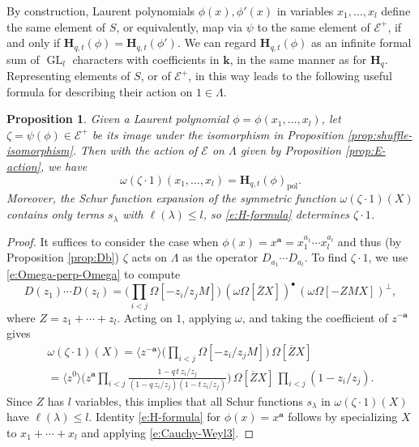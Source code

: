 \documentclass[12pt]{amsart}
\newtheorem{prop}[thm]{Proposition}
\theoremstyle{definition}
\theoremstyle{remark}
\newcommand{\kk}{{\mathbf k}}
\newcommand{\aA}{{\mathbf a}}
\newcommand{\Hbold}{{\mathbf H}}
\newcommand{\Ecal}{{\mathcal E}}
\DeclareMathOperator{\pol}{pol}
\DeclareMathOperator{\GL}{GL}
\begin{document}
By construction, Laurent polynomials $\phi(x), \phi '(x)$ in variables
$x_{1},\ldots,x_{l}$ define the same element of $S$, or equivalently,
map via $\psi $ to the same element of $\Ecal ^{+}$, if and only if
$\Hbold _{q,t}(\phi ) = \Hbold _{q,t}(\phi ')$.  We can regard $\Hbold
_{q,t}(\phi )$ as an infinite formal sum of $\GL _{l}$ characters with
coefficients in $\kk $, in the same manner as for $\Hbold _{q}$.
Representing elements of $S$, or of $\Ecal ^{+}$, in this way leads to
the following useful formula for describing their action on $1\in
\Lambda $.

\begin{prop}\label{prop:H-formula}
Given a Laurent polynomial $\phi=\phi (x_{1},\ldots,x_{l})$, let $\zeta =
\psi (\phi ) \in \Ecal ^{+}$ be its image under the isomorphism in
Proposition \ref{prop:shuffle-isomorphism}.  Then with the action of
$\Ecal $ on $\Lambda $ given by Proposition \ref{prop:E-action}, we
have
\begin{equation}\label{e:H-formula}
\omega (\zeta \cdot 1)(x_{1},\ldots,x_{l}) = \Hbold _{q,t}(\phi)_{\pol }.
\end{equation}
Moreover, the Schur function expansion of the symmetric function
$\omega (\zeta \cdot 1)(X)$ contains only terms $s_{\lambda }$ with
$\ell(\lambda )\leq l$, so \eqref{e:H-formula} determines $\zeta \cdot
1$.
\end{prop}

\begin{proof}
It suffices to consider the case when $\phi (x)=x^{\aA} =
x_{1}^{a_{1}}\cdots x_{l}^{a_{l}}$ and thus (by Proposition
\ref{prop:Db}) $\zeta$ acts on $\Lambda $ as the operator
$D_{a_{1}}\cdots D_{a_{l}}$.  To find $\zeta \cdot 1$, we use
\eqref{e:Omega-perp-Omega} to compute
\begin{equation}\label{e:Dz-straightened}
D(z_{1})\cdots D(z_{l}) =\bigl(\prod _{i<j} \Omega [-z_{i}/z_{j} M]
\bigr)\, (\omega \Omega [\overline{Z} X])^{\bullet }\, (\omega \Omega
[-Z M X])^{\perp },
\end{equation}
where $Z = z_{1}+\cdots +z_{l}$.  Acting on $1$, applying $\omega $,
and taking the coefficient of $z^{-\aA }$ gives
\begin{multline}\label{e:Dz-on-1}
\omega (\zeta \cdot 1)(X) = \langle z^{-\aA } \rangle \bigl(\prod _{i<j}
\Omega [-z_{i}/z_{j} M] \bigr)\, \Omega [\overline{Z} X] \\
= \langle z^{0} \rangle \bigl(z^{\aA }\prod _{i<j} \frac{1-q\, t\,
z_{i}/z_{j}}{(1-q \, z_{i}/z_{j})(1-t \, z_{i}/z_{j})} \bigr)\, \Omega
[\overline{Z} X] \, \prod _{i<j}(1-z_{i}/z_{j}).
\end{multline}
Since $Z$ has $l$ variables, this implies that all Schur functions $s_\lambda $ in $\omega (\zeta \cdot 1)(X)$ have $\ell(\lambda )\leq l$.
Identity \eqref{e:H-formula} for $\phi (x) = x^{\aA }$
follows by specializing $X$ to $x_1+\cdots +x_l$ and applying \eqref{e:Cauchy-Weyl3}.
\end{proof}
\end{document}
